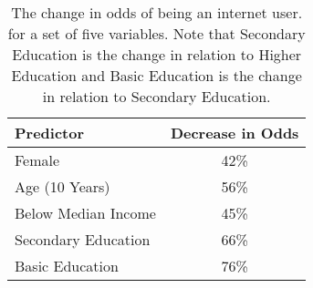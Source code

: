 \documentclass[12pt]{article}
\theoremstyle{definition}
\theoremstyle{algodesc}
\numberwithin{equation}{section}
\begin{document}
\begin{table}[h]
\centering
\begin{tabular}{lc}
\toprule
\textbf{Predictor} & \textbf{Decrease in Odds} \\ \midrule
Female    &   42\%    \\ 
Age (10 Years)   & 56\%       \\ 
Below Median Income    & 45\% \\
Secondary Education    & 66\%  \\
Basic Education  & 76\% \\
\bottomrule                                      
\end{tabular}
\caption{The change in odds of being an internet user. for a set of five variables. Note that Secondary Education is the change in relation to Higher Education and Basic Education is the change in relation to Secondary Education. }
\label{tab:predictors}
\end{table}

\vspace{16cm}
\end{document}

